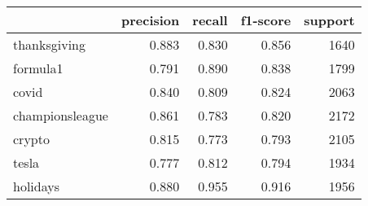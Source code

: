 \begin{tabular}{lrrrr}
\toprule
{} &  precision &  recall &  f1-score &  support \\
\midrule
thanksgiving    &      0.883 &   0.830 &     0.856 &     1640 \\
formula1        &      0.791 &   0.890 &     0.838 &     1799 \\
covid           &      0.840 &   0.809 &     0.824 &     2063 \\
championsleague &      0.861 &   0.783 &     0.820 &     2172 \\
crypto          &      0.815 &   0.773 &     0.793 &     2105 \\
tesla           &      0.777 &   0.812 &     0.794 &     1934 \\
holidays        &      0.880 &   0.955 &     0.916 &     1956 \\
\bottomrule
\end{tabular}
